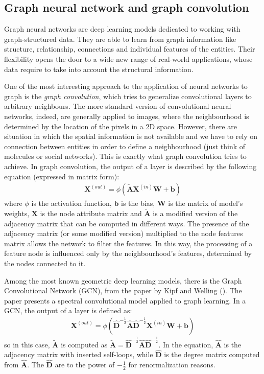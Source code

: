 \subsection{Graph neural network and graph convolution} Graph neural networks are deep learning models dedicated to working with graph-structured data. They are able to learn from graph information like structure, relationship, connections and individual features of the entities. Their flexibility opens the door to a wide new range of real-world applications, whose data require to take into account the structural information.

One of the most interesting approach to the application of neural networks to graph is the \textit{graph convolution}, which tries to generalize convolutional layers to arbitrary neighbours. The more standard version of convolutional neural networks, indeed, are generally applied to images, where the neighbourhood is determined by the location of the pixels in a 2D space. However, there are situation in which the spatial information is not available and we have to rely on connection between entities in order to define a neighbourhood (just think of molecules or social networks). This is exactly what graph convolution tries to achieve. In graph convolution, the output of a layer is described by the following equation (expressed in matrix form):
\begin{align}
    \mathbf{X}^{(out)}=\phi\left(\tilde{\mathbf{A}} \mathbf{X}^{(in)} \mathbf{W} + \mathbf{b}\right)
\end{align}
where $\phi$ is the activation function, $\mathbf{b}$ is the bias, $\mathbf{W}$ is the matrix of model's weights, $\mathbf{X}$ is the node attribute matrix and $\tilde{\mathbf{A}}$ is a modified version of the adjacency matrix that can be computed in different ways. The presence of the adjacency matrix (or some modified version) multiplied to the node features matrix allows the network to filter the features. In this way, the processing of a feature node is influenced only by the neighbourhood's features, determined by the nodes connected to it.

Among the most known geometric deep learning models, there is the Graph Convolutional Network (GCN), from the paper by Kipf and Welling (\cite{arXiv:gcn}). The paper presents a spectral convolutional model applied to graph learning. In a GCN, the output of a layer is defined as:
\begin{align}
    \mathbf{X}^{(out)}=\phi\left(\hat{\mathbf{D}}^{-\frac{1}{2}} \hat{\mathbf{A}} \hat{\mathbf{D}}^{-\frac{1}{2}} \mathbf{X}^{(in)} \mathbf{W} + \mathbf{b}\right)
\end{align}
so in this case, $\tilde{\mathbf{A}}$ is computed as $\tilde{\mathbf{A}} = \hat{\mathbf{D}}^{-\frac{1}{2}} \hat{\mathbf{A}} \hat{\mathbf{D}}^{-\frac{1}{2}}$. In the equation, $\hat{\mathbf{A}}$ is the adjacency matrix with inserted self-loops, while $\hat{\mathbf{D}}$ is the degree matrix computed from $\hat{\mathbf{A}}$. The $\hat{\mathbf{D}}$ are to the power of $-\frac{1}{2}$ for renormalization reasons.

